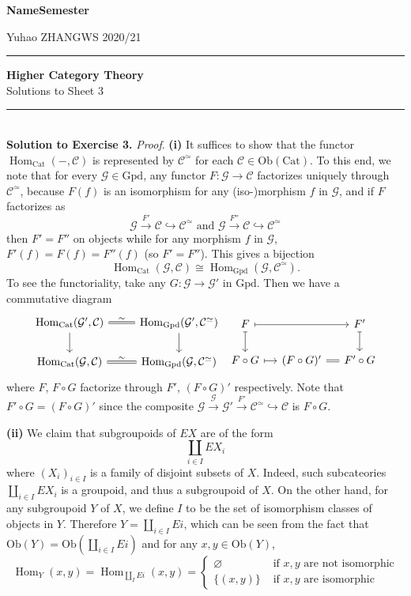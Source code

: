 \documentclass[a4paper,11pt]{amsart}
\DeclareMathOperator{\Hom}{Hom}
\newcommand{\ito}{\hookrightarrow}
\newcommand{\C}{\mathcal C}
\renewcommand{\hom}{\operatorname{Hom}}
\newcommand{\cat}{\mathrm{Cat}}
\newcommand{\gpd}{\mathrm{Gpd}}
\newcommand{\G}{\mathcal G}
\newcommand{\ob}{\mathrm{Ob}}
\begin{document}
\textbf{Name}\hfill\textbf{Semester}

\vspace*{-.1cm} Yuhao ZHANG\hfill WS 2020/21


\vspace*{.6cm}
\rule{\linewidth}{1pt}
\begin{center}
\Large
{\bf Higher Category Theory} \\
Solutions to Sheet 3
\end{center}
\rule{\linewidth}{1pt}
\\







\textbf{Solution to Exercise 3.} \textit{Proof}. \textbf{(i)} It suffices to show that the functor $\Hom_\cat(-,\C)$ is represented by $\C^\simeq$ for each $\C\in\ob(\cat)$. To this end, we note that for every $\G\in\gpd$, any functor $F\colon\G\to\C$ factorizes uniquely through $\C^\simeq$, because $F(f)$ is an isomorphism for any (iso-)morphism $f$ in $\G$, and if $F$ factorizes as 
\[
\G\overset{F'}{\to}\C\ito\C^\simeq\text{ and }\G\overset{F''}{\to}\C\ito\C^\simeq
\]
then $F'=F''$ on objects while for any morphism $f$ in $\G$, $F'(f)=F(f)=F''(f)$ (so $F'=F''$). This gives a bijection
\[
\hom_\cat(\G,\C)\cong\hom_\gpd(\G,\C^\simeq).
\]
To see the functoriality, take any $G\colon\G\to\G'$ in $\gpd$. Then we have a commutative diagram
\[
\begin{tikzcd}
\hom_\cat(\G',\C)\arrow[r,equal,"\sim"]\arrow[d]& \hom_\gpd(\G',\C^\simeq)\arrow[d]\\
\hom_\cat(\G,\C)\arrow[r,equal,"\sim"]& \hom_\gpd(\G,\C^\simeq)
\end{tikzcd}
\ 
\begin{tikzcd}[column sep=small]
F\arrow[rr,mapsto]\arrow[d,mapsto]&& F'\arrow[d,mapsto]\\
F\circ G\arrow[r,mapsto]& (F\circ G)'\arrow[r,equal]& F'\circ G
\end{tikzcd}
\]
where $F$, $F\circ G$ factorize through $F'$, $(F\circ G)'$ respectively. Note that $F'\circ G=(F\circ G)'$ since the composite $\G\overset{\G}{\to}\G'\overset{F'}{\to}\C^\simeq\ito\C$ is $F\circ G$.

\textbf{(ii)} We claim that subgroupoids of $EX$ are of the form
\[
\coprod_{i\in I}EX_i
\]
where $(X_i)_{i\in I}$ is a family of disjoint subsets of $X$. Indeed, such subcateories $\coprod_{i\in I}EX_i$ is a groupoid, and thus a subgroupoid of $X$. On the other hand, for any subgroupoid $Y$ of $X$, we define $I$ to be the set of isomorphism classes of objects in $Y$. Therefore $Y=\coprod_{i\in I}Ei$, which can be seen from the fact that $\ob(Y)=\ob(\coprod_{i\in I}Ei)$ and for any $x,y\in\ob(Y)$, 
\[
\hom_Y(x,y)=\hom_{\coprod_IEi}(x,y)=\left\{\begin{array}{ll}
\varnothing& \text{ if $x,y$ are not isomorphic}\\
\{(x,y)\}&\text{ if $x,y$ are isomorphic}
\end{array}\right.
\]
\end{document}
